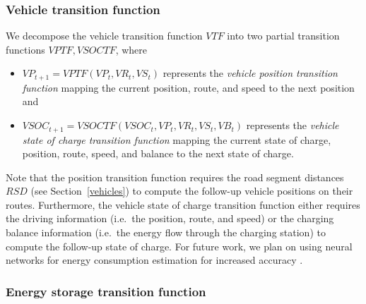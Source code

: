 \subsubsection{Vehicle transition function}
\label{transitions_vehicles}

We decompose the vehicle transition function $VTF$ into two partial transition functions $VPTF,VSOCTF$, where
\begin{itemize}
	\item $VP_{t+1} = VPTF(VP_t, VR_t, VS_t)$ represents the \textit{vehicle position transition function} mapping the current position, route, and speed to the next position and
	\item $VSOC_{t+1} = VSOCTF(VSOC_t, VP_t, VR_t, VS_t, VB_t)$ represents the \textit{vehicle state of charge transition function} mapping the current state of charge, position, route, speed, and balance to the next state of charge.
\end{itemize}
Note that the position transition function requires the road segment distances $RSD$ (see Section~\ref{vehicles}) to compute the follow-up vehicle positions on their routes. Furthermore, the vehicle state of charge transition function either requires the driving information (i.e.\ the position, route, and speed) or the charging balance information (i.e.\ the energy flow through the charging station) to compute the follow-up state of charge. For future work, we plan on using neural networks for energy consumption estimation for increased accuracy \cite{felipe2015energy}.

\subsubsection{Energy storage transition function}
\label{transitions_storages}

